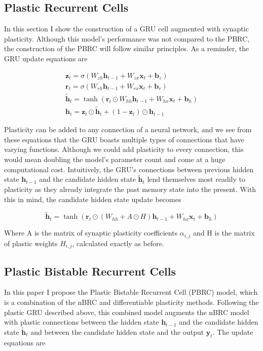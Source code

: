 \subsection*{Plastic Recurrent Cells}

In this section I show the construction of a GRU cell augmented with synaptic plasticity. Although this model's performance was not compared to the PBRC, the construction of the PBRC will follow similar principles.
As a reminder, the GRU update equations are

\begin{gather*}
	\mathbf{z}_t = \sigma(W_{zh} \mathbf{h}_{t-1} + W_{zx} \mathbf{x}_t + \mathbf{b}_z)\\
	\mathbf{r}_t = \sigma(W_{rh} \mathbf{h}_{t-1} + W_{rx} \mathbf{x}_t + \mathbf{b}_r)\\
	\mathbf{\tilde{h}}_t = \tanh(\mathbf{r}_t \odot W_{hh} \mathbf{h}_{t-1} + W_{hx} \mathbf{x}_t + \mathbf{b}_h)\\
	\mathbf{h}_t = \mathbf{z}_t \odot \mathbf{\tilde{h}}_t + (1 - \mathbf{z}_t) \odot \mathbf{h}_{t-1}
\end{gather*}

Plasticity can be added to any connection of a neural network, and we see from these equations that the GRU boasts multiple types of connections that have varying functions. Although we could add plasticity to every connection, this would mean doubling the model's parameter count and come at a huge computational cost. Intuitively, the GRU's connections between previous hidden state \(\mathbf{h}_{t-1}\) and the candidate hidden state \(\mathbf{\tilde{h}}_t\) lend themselves most readily to plasticity as they already integrate the past memory state into the present. With this in mind, the candidate hidden state update becomes

\[ \mathbf{\tilde{h}}_t = \tanh(\mathbf{r}_t \odot (W_{hh} + A \odot H) \mathbf{h}_{t-1} + W_{hx} \mathbf{x}_t + \mathbf{b}_h) \]

Where A is the matrix of synaptic plasticity coefficients \(\alpha_{i,j}\) and H is the matrix of plastic weights \(H_{i,j}\), calculated exactly as before.

\subsection*{Plastic Bistable Recurrent Cells}

In this paper I propose the Plastic Bistable Recurrent Cell (PBRC) model, which is a combination of the nBRC and differentiable plasticity methods. Following the plastic GRU described above, this combined model augments the nBRC model with plastic connections between the hidden state \(\mathbf{h}_{t-1}\) and the candidate hidden state \(\mathbf{\tilde{h}}_t\) and between the candidate hidden state and the output \(\mathbf{y}_t\). The update equations are
